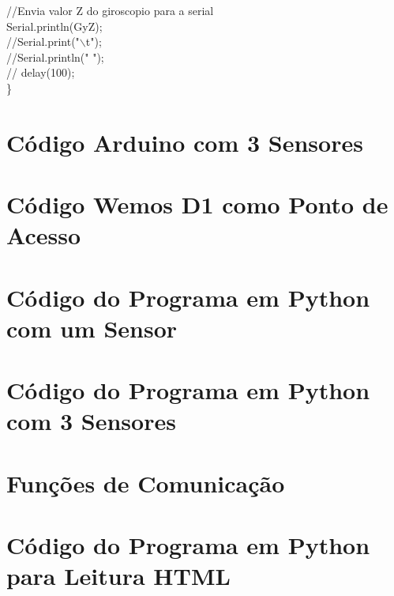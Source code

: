 \begin{apendicesenv}
//Envia valor Z do giroscopio para a serial\\ 
Serial.println(GyZ);\\
//Serial.print("$\backslash$t");\\
//Serial.println(" ");\\
// delay(100);\\

\}\\
\chapter {Código Arduino com 3 Sensores}
\label{apB}
\footnotesize
 

\chapter {Código Wemos D1 como Ponto de Acesso}
\label{apC}
\footnotesize
 

\chapter{Código do Programa em Python com um Sensor}
\label{apD}
\footnotesize
 
\chapter{Código do Programa em Python com 3 Sensores}
\label{apE}
\footnotesize
 
\chapter{Funções de Comunicação}
\label{apF}
\footnotesize
 

\chapter{Código do Programa em Python para Leitura HTML}
\label{apG}
\footnotesize


\end{apendicesenv}
